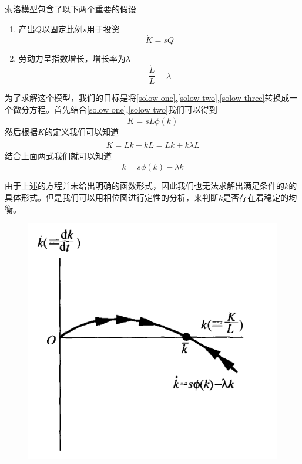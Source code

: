 \documentclass[UTF8,12pt]{ctexart}
\numberwithin{equation}{section} %
\numberwithin{figure}{section}
\numberwithin{table}{section}
\begin{document}
	索洛模型包含了以下两个重要的假设
	\begin{enumerate}
		\item 产出$Q$以固定比例$s$用于投资
		\begin{equation}
			\dot{K} = sQ \label{solow two}
		\end{equation}
	
		\item 劳动力呈指数增长，增长率为$\lambda$
		\begin{equation}
			\frac{\dot{L}}{L} = \lambda \label{solow three}
		\end{equation}
	\end{enumerate}

	为了求解这个模型，我们的目标是将\ref{solow one},\ref{solow two},\ref{solow three}转换成一个微分方程。首先结合\ref{solow one},\ref{solow two}我们可以得到
	\begin{equation}
		\dot{K} = sL\phi(k)
	\end{equation}
	然后根据$\dot{K}$的定义我们可以知道
	\begin{equation}
		\begin{aligned}
			\dot{K} = L\dot{k} + k\dot{L} = L\dot{k} + k\lambda L 
		\end{aligned}
	\end{equation}
	结合上面两式我们就可以知道
	\begin{equation}
		\dot{k} =s\phi(k) -  \lambda k
	\end{equation}
	
	由于上述的方程并未给出明确的函数形式，因此我们也无法求解出满足条件的$k$的具体形式。但是我们可以用相位图进行定性的分析，来判断$k$是否存在着稳定的均衡。
	
	\begin{figure}[htbp]
		\centering
		\includegraphics[scale=0.5]{"solow.png"}
	\end{figure}
\end{document}
